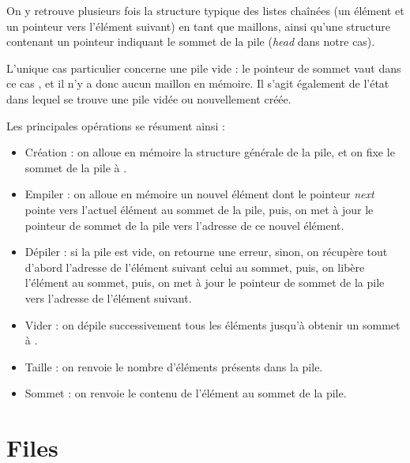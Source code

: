 \documentclass[11pt,a4paper]{article}
\begin{document}
On y retrouve plusieurs fois la structure typique des listes chaînées (un élément et un pointeur vers l'élément suivant) en tant que maillons, ainsi qu'une structure contenant un pointeur indiquant le sommet de la pile (\textit{head} dans notre cas).

L'unique cas particulier concerne une pile vide : le pointeur de sommet vaut dans ce cas , et il n'y a donc aucun maillon en mémoire.
Il s'agit également de l'état dans lequel se trouve une pile vidée ou nouvellement créée.\\

\bigskip


Les principales opérations se résument ainsi :
\begin{itemize}
\item Création : on alloue en mémoire la structure générale de la pile, et on fixe le sommet de la pile à .
\item Empiler : on alloue en mémoire un nouvel élément dont le pointeur \textit{next} pointe vers l'actuel élément au sommet de la pile, puis, on met à jour le pointeur de sommet de la pile vers l'adresse de ce nouvel élément.
\item Dépiler : si la pile est vide, on retourne une erreur, sinon, on récupère tout d'abord l'adresse de l'élément suivant celui au sommet, puis, on libère l'élément au sommet, puis, on met à jour le pointeur de sommet de la pile vers l'adresse de l'élément suivant.
\item Vider : on dépile successivement tous les éléments jusqu'à obtenir un sommet à .
\item Taille : on renvoie le nombre d'éléments présents dans la pile.
\item Sommet : on renvoie le contenu de l'élément au sommet de la pile.
\end{itemize}


\newpage


\section{Files}
\end{document}
